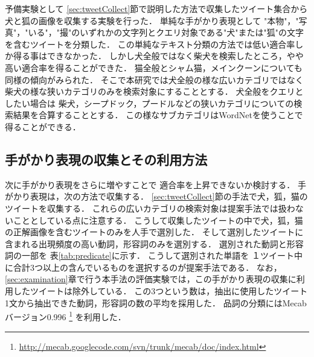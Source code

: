 予備実験として
\ref{sec:tweetCollect}節で説明した方法で収集したツイート集合から
犬と狐の画像を収集する実験を行った．
単純な手がかり表現として
"本物"，"写真"，"いる"，"撮"のいずれかの文字列とクエリ対象である"犬"または"狐"の文字を含むツイートを分類した．
この単純なテキスト分類の方法では低い適合率しか得る事はできなかった．
しかし犬全般ではなく柴犬を検索したところ，やや高い適合率を得ることができた．
猫全般とシャム猫，メインクーンについても同様の傾向がみられた．
そこで本研究では犬全般の様な広いカテゴリではなく柴犬の様な狭いカテゴリのみを検索対象にすることとする．
犬全般をクエリとしたい場合は
柴犬，シープドック，プードルなどの狭いカテゴリについての検索結果を合算することとする．
この様なサブカテゴリはWordNetを使うことで得ることができる．









\subsection{手がかり表現の収集とその利用方法}

次に手がかり表現をさらに増やすことで
適合率を上昇できないか検討する．
手がかり表現は，次の方法で収集する．
%
\ref{sec:tweetCollect}節の手法で犬，狐，猫のツイートを収集する．
これらの広いカテゴリの検索対象は提案手法では扱わないこととしている点に注意する．
こうして収集したツイートの中で犬，狐，猫の正解画像を含むツイートのみを人手で選別した．
そして選別したツイートに含まれる出現頻度の高い動詞，形容詞のみを選別する．
選別された動詞と形容詞の一部を
表\ref{tab:predicate}に示す．
こうして選別された単語を
１ツイート中に合計3つ以上の含んでいるものを選択するのが提案手法である．
なお，
\ref{sec:examination}章で行う本手法の評価実験では，この手がかり表現の収集に利用したツイートは除外している．
この3つという数は，抽出に使用したツイート1文から抽出できた動詞，形容詞の数の平均を採用した．
品詞の分類にはMecabバージョン0.996
\footnote{\url{http://mecab.googlecode.com/svn/trunk/mecab/doc/index.html}}
を利用した．



